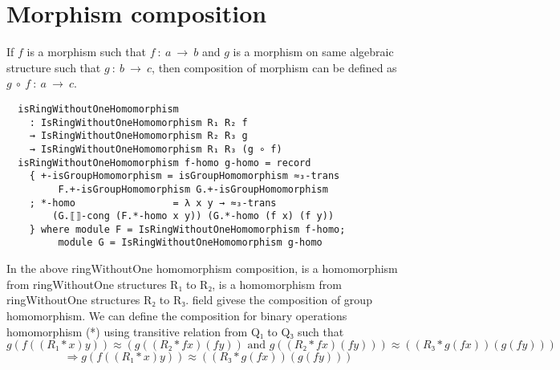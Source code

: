 \section{Morphism composition}
If $f$ is a morphism such that $f\ :\ a \ \rightarrow \ b$ and $g$ is a morphism on same
algebraic structure such that $g\ :\ b\ \rightarrow \ c$, then composition of morphism can be
defined as $g \ ∘\ f\ :\ a \ \rightarrow \ c$.
\begin{verbatim}
  isRingWithoutOneHomomorphism
    : IsRingWithoutOneHomomorphism R₁ R₂ f
    → IsRingWithoutOneHomomorphism R₂ R₃ g
    → IsRingWithoutOneHomomorphism R₁ R₃ (g ∘ f)
  isRingWithoutOneHomomorphism f-homo g-homo = record
    { +-isGroupHomomorphism = isGroupHomomorphism ≈₃-trans
		 F.+-isGroupHomomorphism G.+-isGroupHomomorphism
    ; *-homo                 = λ x y → ≈₃-trans 
		(G.⟦⟧-cong (F.*-homo x y)) (G.*-homo (f x) (f y))
    } where module F = IsRingWithoutOneHomomorphism f-homo;
		 module G = IsRingWithoutOneHomomorphism g-homo
\end{verbatim}
In the above ringWithoutOne homomorphism composition,  is a
homomorphism from ringWithoutOne structures R₁ to R₂,  is a
homomorphism from ringWithoutOne structures R₂ to R₃.
 field givese the composition of group homomorphism.
We can define the composition for binary operations homomorphism (*) using
transitive relation  from Q₁ to Q₃ such that \[g (f ((R₁ * x)
y)) ≈ (g ((R₂ * f x) (f y)) \text{ and } g ((R₂ * f x) (f y))) ≈ ((R₃ * g (f x))
(g (f y)))\]
\[\Rightarrow g (f ((R₁ * x) y)) ≈ ((R₃ * g (f x)) (g (f y)))\]
